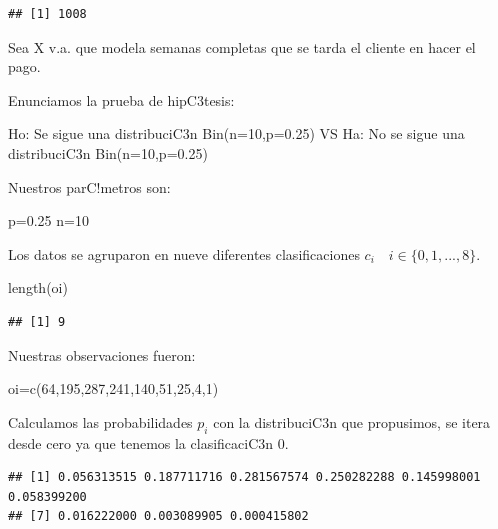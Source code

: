 \documentclass[
]{article}
\newenvironment{Shaded}{\begin{snugshade}}{\end{snugshade}}
\newcommand{\DecValTok}[1]{\textcolor[rgb]{0.00,0.00,0.81}{#1}}
\newcommand{\FloatTok}[1]{\textcolor[rgb]{0.00,0.00,0.81}{#1}}
\newcommand{\FunctionTok}[1]{\textcolor[rgb]{0.00,0.00,0.00}{#1}}
\newcommand{\NormalTok}[1]{#1}
\newcommand{\OtherTok}[1]{\textcolor[rgb]{0.56,0.35,0.01}{#1}}
\begin{document}
\begin{verbatim}
## [1] 1008
\end{verbatim}

Sea X v.a. que modela semanas completas que se tarda el cliente en hacer
el pago.

Enunciamos la prueba de hipC3tesis:

Ho: Se sigue una distribuciC3n Bin(n=10,p=0.25) VS Ha: No se sigue una
distribuciC3n Bin(n=10,p=0.25)

Nuestros parC!metros son:

\begin{Shaded}
\begin{Highlighting}[]
\NormalTok{p}\OtherTok{=}\FloatTok{0.25}
\NormalTok{n}\OtherTok{=}\DecValTok{10}
\end{Highlighting}
\end{Shaded}

Los datos se agruparon en nueve diferentes clasificaciones
\(c_{i} \quad i\in \{0,1,...,8 \}\).

\begin{Shaded}
\begin{Highlighting}[]
\FunctionTok{length}\NormalTok{(oi)}
\end{Highlighting}
\end{Shaded}

\begin{verbatim}
## [1] 9
\end{verbatim}

Nuestras observaciones fueron:

\begin{Shaded}
\begin{Highlighting}[]
\NormalTok{oi}\OtherTok{=}\FunctionTok{c}\NormalTok{(}\DecValTok{64}\NormalTok{,}\DecValTok{195}\NormalTok{,}\DecValTok{287}\NormalTok{,}\DecValTok{241}\NormalTok{,}\DecValTok{140}\NormalTok{,}\DecValTok{51}\NormalTok{,}\DecValTok{25}\NormalTok{,}\DecValTok{4}\NormalTok{,}\DecValTok{1}\NormalTok{)}
\end{Highlighting}
\end{Shaded}

Calculamos las probabilidades \(p_{i}\) con la distribuciC3n que
propusimos, se itera desde cero ya que tenemos la clasificaciC3n 0.

\begin{verbatim}
## [1] 0.056313515 0.187711716 0.281567574 0.250282288 0.145998001 0.058399200
## [7] 0.016222000 0.003089905 0.000415802
\end{verbatim}
\end{document}
